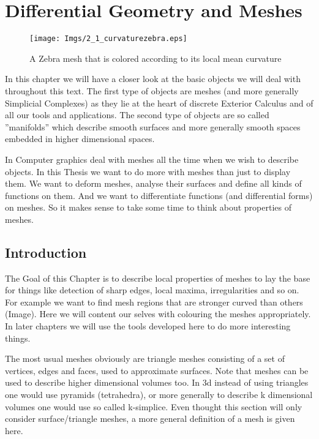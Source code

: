 \chapter{Differential Geometry and Meshes}
	
	\begin{figure}[ht]
	\begin{center}
	\texttt{[image: Imgs/2\_1\_curvaturezebra.eps]}
	\end{center}
	\caption{A Zebra mesh that is colored according to its local mean curvature}
	\end{figure}
	
	


In this chapter we will have a closer look at the basic objects we will deal with throughout this text. The first type of objects are meshes (and more generally Simplicial Complexes) as they lie at the heart of discrete Exterior Calculus and of all our tools and applications. The second type of objects are so called ''manifolds'' which describe smooth surfaces and more generally smooth spaces embedded in higher dimensional spaces.
	
	In Computer graphics deal with meshes all the time when we wish to describe objects. In this Thesis we want to do more with meshes than just to display them. We want to deform meshes, analyse their surfaces and define all kinds of functions on them. And we want to differentiate functions (and differential forms) on meshes. So it makes sense to take some time to think about properties of meshes.	
	

	
\section{Introduction}
 
	The Goal of this Chapter is to describe local properties of meshes to lay the base for things like detection of sharp edges, local maxima, irregularities and so on. For example we want to find mesh regions that are stronger curved than others (Image). Here we will content our selves with colouring the meshes appropriately. In later chapters we will use the tools developed here to do more interesting things.
	
	The most usual meshes obviously are triangle meshes consisting of a set of vertices, edges and faces, used to approximate surfaces. Note that meshes can be used to describe higher dimensional volumes too. In 3d instead of using triangles one would use pyramids (tetrahedra), or more generally to describe k dimensional volumes one would use so called k-simplice. Even thought this section will only consider surface/triangle meshes, a more general definition of a mesh is given here.
	
